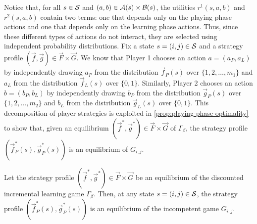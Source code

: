     Notice that, for all $s \in \mathcal{S}$ and $(a, b) \in \mathcal{A}(s) \times \mathcal{B}(s)$, the utilities $r^1(s, a, b)$ and $r^2(s, a, b)$ contain two terms: one that depends only on the playing phase actions and one that depends only on the learning phase actions.
    Thus, since these different types of actions do not interact, they are selected using independent probability distributions.
    Fix a state $s = (i, j) \in \mathcal{S}$ and a strategy profile $(\vec{f}, \vec{g}) \in \vec{F} \times \vec{G}$.
    We know that Player 1 chooses an action $a = (a_P, a_L)$ by independently drawing $a_P$ from the distribution $\vec{f}_P(s)$ over $\{1, 2, \ldots, m_1\}$ and $a_L$ from the distribution $\vec{f}_L(s)$ over $\{0, 1\}$.
    Similarly, Player 2 chooses an action $b = (b_P, b_L)$ by independently drawing $b_P$ from the distribution $\vec{g}_P(s)$ over $\{1, 2, \ldots, m_2\}$ and $b_L$ from the distribution $\vec{g}_L(s)$ over $\{0, 1\}$.
    This decomposition of player strategies is exploited in \autoref{prop:playing-phase-optimality} to show that, given an equilibrium $(\vec{f}^*, \vec{g}^*) \in \vec{F} \times \vec{G}$ of $\Gamma_{\beta}$, the strategy profile $(\vec{f}^*_P(s), \vec{g}^*_P(s))$ is an equilibrium of $G_{i, j}$.

    \begin{proposition} \label{prop:playing-phase-optimality}
        Let the strategy profile $(\vec{f}^*, \vec{g}^*) \in \vec{F} \times \vec{G}$ be an equilibrium of the discounted incremental learning game $\Gamma_\beta$.
        Then, at any state $s = (i, j) \in \mathcal{S}$, the strategy profile $(\vec{f}^*_P(s), \vec{g}^*_P(s))$ is an equilibrium of the incompetent game $G_{i, j}$.
        
    \end{proposition}

